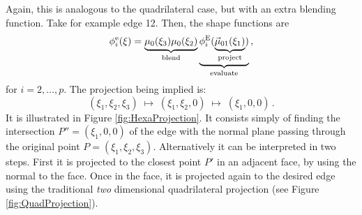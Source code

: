 Again, this is analogous to the quadrilateral case, but with an extra blending function. 
Take for example edge 12.
Then, the shape functions are
\begin{equation*}
	\phi_i^\mathrm{e}(\xi)=\underbrace{\mu_0(\xi_3)\mu_0(\xi_2)}_{\text{blend}}
		 \underbrace{\phi_i^{\mathrm{E}}(\underbrace{\vec{\mu}_{01}(\xi_1)}_{\text{project}})}_{\text{evaluate}}\,,
\end{equation*}
for $i=2,\ldots,p$. 
The projection being implied is:
\begin{equation*}
	(\xi_1,\xi_2,\xi_3)\;\longmapsto\;(\xi_1,\xi_2,0)\;\longmapsto\;(\xi_1,0,0)\,.
\end{equation*}
It is illustrated in Figure \ref{fig:HexaProjection}. 
It consists simply of finding the intersection $P''=(\xi_1,0,0)$ of the edge with the normal plane passing through the original point $P=(\xi_1,\xi_2,\xi_3)$.
Alternatively it can be interpreted in two steps.
First it is projected to the closest point $P'$ in an adjacent face, by using the normal to the face.
Once in the face, it is projected again to the desired edge using the traditional \textit{two} dimensional quadrilateral projection (see Figure \ref{fig:QuadProjection}).


